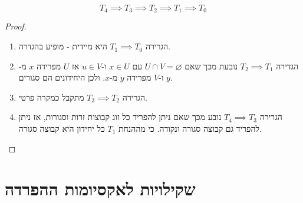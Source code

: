\documentclass{tstextbook}
\begin{document}
\begin{proposition}
$$T_{4}\implies T_{3}\implies T_{2}\implies T_{1}\implies T_{0}$$

\end{proposition}
\begin{proof}
  \begin{enumerate}
    \item הגרירה \(T_{1}\implies T_{0}\) היא מיידית - מופיע בהגדרה. 


    \item הגדירה \(T_{2}\implies T_{1}\) נובעת מכך שאם \(U\cap V=\varnothing\) עם \(x \in U\) ו-\(u \in V\) אז \(U\) מפרידה \(x\) מ-\(y\) ו-\(V\) מפרידה \(y\) מ-\(x\). ולכן היחידונים הם סגורים. 


    \item הגרירה \(T_{3}\implies T_{2}\) מתקבל כמקרה פרטי. 


    \item הגרירה \(T_{4}\implies T_{3}\) נובע מכך שאם ניתן להפריד כל זוג קבוצות זרות וסגורות, אז ניתן להפריד גם קבוצה סגורה ונקודה. כי מההנחת \(T_{1}\) כל יחידון היא קבוצה סגורה. 


  \end{enumerate}
\end{proof}
\section{שקילויות לאקסיומות ההפרדה}
\end{document}
